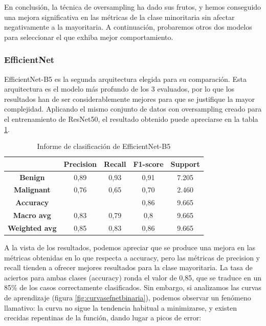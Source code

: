 En conclusión, la técnica de oversampling ha dado sus frutos, y hemos conseguido una mejora significativa en las métricas de la clase minoritaria sin afectar negativamente a la mayoritaria. A continuación, probaremos otros dos modelos para seleccionar el que exhiba mejor comportamiento.

\subsubsection{EfficientNet}

EfficientNet-B5 es la segunda arquitectura elegida para su comparación. Esta arquitectura es el modelo más profundo de los 3 evaluados, por lo que los resultados han de ser considerablemente mejores para que se justifique la mayor complejidad. Aplicando el mismo conjunto de datos con oversampling creado para el entrenamiento de ResNet50, el resultado obtenido puede apreciarse en la tabla \ref{tab:resefnet}.

\begin{table}[H]
	\centering
	\begin{tabular}{|c|c|c|c|c|}
		\hline
		\textbf{} & \textbf{Precision} & \textbf{Recall} & \textbf{F1-score} & \textbf{Support} \\ \hline
		\textbf{Benign} & 0,89 & 0,93 & 0,91 & 7.205 \\ \hline
		\textbf{Malignant} & 0,76 & 0,65 & 0,70 & 2.460 \\ \hline
		\textbf{Accuracy} &  &  & 0,86 & 9.665 \\ \hline
		\textbf{Macro avg} & 0,83& 0,79 & 0,8 & 9.665 \\ \hline
		\textbf{Weighted avg} & 0,85 & 0,83 & 0,86 & 9.665 \\ \hline
	\end{tabular}
	\caption{Informe de clasificación de EfficientNet-B5}
	\label{tab:resefnet}
\end{table}

A la vista de los resultados, podemos apreciar que se produce una mejora en las métricas obtenidas en lo que respecta a accuracy, pero las métricas de precision y recall tienden a ofrecer mejores resultados para la clase mayoritaria. La tasa de aciertos para ambas clases (accuracy) ronda el valor de 0,85, que se traduce en un 85\% de los casos correctamente clasificados.  Sin embargo, si analizamos las curvas de aprendizaje (figura \ref{fig:curvasefnetbinaria}), podemos observar un fenómeno llamativo: la curva no sigue la tendencia habitual a minimizarse, y existen crecidas repentinas de la función, dando lugar a picos de error:

